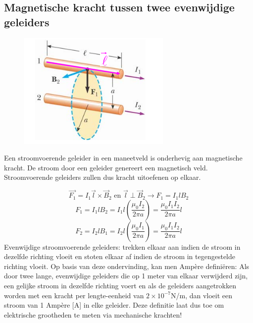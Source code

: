 \documentclass[12pt,a4paper]{article}
\begin{document}
    \subsection{Magnetische kracht tussen twee evenwijdige geleiders}
    \begin{figure}[h]
    	\centering
    	\includegraphics[width=0.5\linewidth]{images/28.2}
    \end{figure}
    Een stroomvoerende geleider in een maneetveld is onderhevig aan magnetische kracht. De stroom door een geleider genereert een magnetisch veld. Stroomvoerende geleiders zullen dus kracht uitoefenen op elkaar. 
    
    \[\vec{F_1} = I_1\vec{l}\times\vec{B}_2 \text{  en  } \vec{l}\perp\vec{B}_2 \rightarrow F_1 = I_1 l B_2\]
    \[F_1 = I_1lB_2 = I_1l(\frac{\mu_0 I_2}{2\pi a}) = \frac{\mu_0 I_1I_2}{2\pi a}l\]
    \[F_2 = I_2lB_1 = I_2l(\frac{\mu_0 I_1}{2\pi a}) = \frac{\mu_0I_1I_2}{2\pi a}l\]
    Evenwijdige stroomvoerende geleiders: trekken elkaar aan indien de stroom in dezelfde richting vloeit en stoten elkaar af indien de stroom in tegengestelde richting vloeit.
	\newline
	Op basis van deze ondervinding, kan men Ampère definiëren: 
	Als door twee lange, evenwijdige geleiders die op 1 meter van elkaar verwijderd zijn, een gelijke stroom in dezelfde richting voert en als de geleiders aangetrokken worden met een kracht per lengte-eenheid van \(2\times 10^{-7}\)N/m, dan vloeit een stroom van 1 Ampère [A] in elke geleider. Deze definitie laat dus toe om elektrische grootheden te meten via mechanische krachten!
\end{document}
